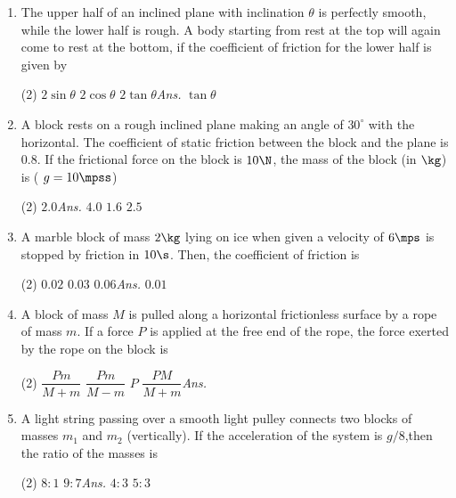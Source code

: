\documentclass{article}
\newcommand{\ans}{\textcolor{red!95}{\textit{\quad Ans.}}}
\begin{document}
\begin{enumerate}
\item The upper half of an inclined plane with inclination $\theta$ is perfectly smooth, while the lower half is rough. A body starting from rest at the top will again come to rest at the bottom, if the coefficient of friction for the lower half is given by
\begin{tasks}(2)
	\task $2\sin\theta$
	\task $2\cos\theta$
	\task $2\tan\theta$\ans
	\task $\tan\theta$
\end{tasks}

\item A block rests on a rough inclined plane making an angle of $30^\circ$ with the horizontal. The coefficient of static friction between the block and the plane is $0.8$. If the frictional force on the block is $10 \N$, the mass of the block (in $\kg$) is ( $g = 10 \mpss$)
\begin{tasks}(2)
	\task $2.0$\ans
	\task $4.0$
	\task $1.6$
	\task $2.5$
\end{tasks}

\item A marble block of mass $2 \kg$ lying on ice when given a velocity of $6\mps$ is stopped by friction in $10 \s$. Then, the coefficient of friction is
\begin{tasks}(2)
	\task $0.02$
	\task $0.03$
	\task $0.06$\ans
	\task $0.01$
\end{tasks}

\item A block of mass $M$ is pulled along a horizontal frictionless surface by a rope of mass $m$. If a force $P$ is applied at the free end of the rope, the force exerted by the rope on the block is
\begin{tasks}(2)
	\task $\dfrac{Pm}{M+m}$
	\task $\dfrac{Pm}{M-m}$
	\task $P$
	\task $\dfrac{PM}{M+m}$\ans
\end{tasks}

\item A light string passing over a smooth light pulley connects two blocks of masses $m_1$ and $m_2$ (vertically). If the acceleration of the system is $g/8$,then the ratio of the masses is
\begin{tasks}(2)
	\task $8:1$
	\task $9:7$\ans
	\task $4:3$
	\task $5:3$
\end{tasks}


\end{enumerate}
\end{document}

